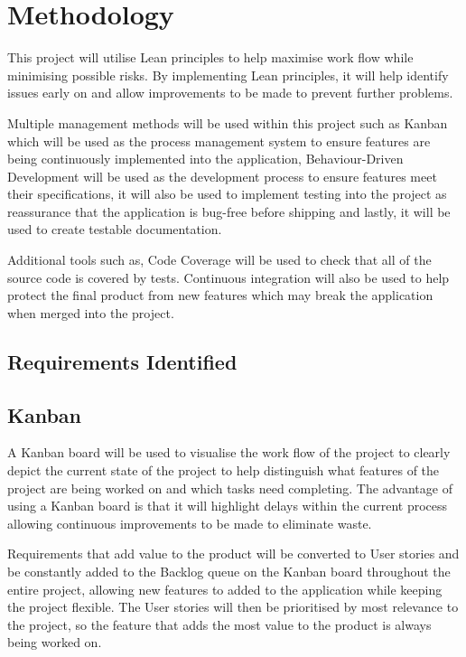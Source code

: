 \chapter{Methodology}
This project will utilise Lean principles to help maximise work flow while minimising possible risks. By implementing Lean principles, it will help identify issues early on and allow improvements to be made to prevent further problems.

Multiple management methods will be used within this project such as Kanban which will be used as the process management system to ensure features are being continuously implemented into the application, Behaviour-Driven Development will be used as the development process to ensure features meet their specifications, it will also be used to implement testing into the project as reassurance that the application is bug-free before shipping and lastly, it will be used to create testable documentation. 

Additional tools such as, Code Coverage will be used to check that all of the source code is covered by tests. Continuous integration will also be used to help protect the final product from new features which may break the application when merged into the project.

\section{Requirements Identified}

\section{Kanban}
A Kanban board will be used to visualise the work flow of the project to clearly depict the current state of the project to help distinguish what features of the project are being worked on and which tasks need completing. The advantage of using a Kanban board is that it will highlight delays within the current process allowing continuous improvements to be made to eliminate waste.

Requirements that add value to the product will be converted to User stories and be constantly added to the Backlog queue on the Kanban board throughout the entire project, allowing new features to added to the application while keeping the project flexible. The User stories will then be prioritised by most relevance to the project, so the feature that adds the most value to the product is always being worked on.

